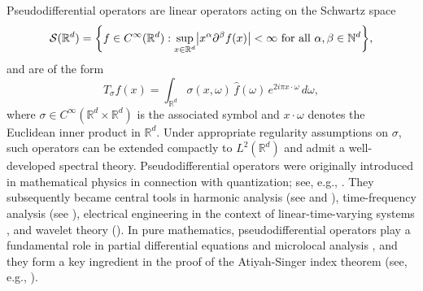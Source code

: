 \documentclass[a4paper,12pt]{article}
\let\originalleft\left
\let\originalright\right
\renewcommand{\left}{\mathopen{}\mathclose\bgroup\originalleft}
\renewcommand{\right}{\aftergroup\egroup\originalright}
\newcommand{\N}{\mathbb{N}}
\newcommand{\R}{\mathbb{R}}
\newcommand{\diff}{\mathop{}\!d}
\newcommand{\symbolnot}{\sigma}
\begin{document}
Pseudodifferential operators are linear operators acting on the Schwartz space
\[
\mathcal{S}(\R^d)
=
\left\{ f \in C^\infty(\R^d) :
\sup_{x\in\R^d} \left| x^\alpha \partial^\beta f(x) \right| < \infty
\text{ for all } \alpha, \beta \in \N^d \right\},
\]
and are of the form
\begin{equation}\label{eq:kohn-nirenberg-def}
    T_{\symbolnot} f (x)
    =
    \int_{\R^d}
    \symbolnot(x, \omega)\, \hat f (\omega)\, e^{2i\pi x \cdot \omega}\, d\omega,
\end{equation}
where $\symbolnot \in C^\infty(\R^d\times\R^d)$ is the associated symbol and
$x \cdot \omega$ denotes the Euclidean inner product in $\R^d$.
Under appropriate regularity assumptions on $\symbolnot$, such operators 
can be extended compactly to %
$L^2(\R^d)$ and admit a well-developed spectral theory. Pseudodifferential operators were originally introduced in mathematical physics in connection with quantization; see, e.g.,
\cite{weyl1950theory,wong1998weyl}.
They subsequently became central tools in harmonic analysis (see \cite{steinharmonic} and \cite[Chapter~2]{follandharmonic}), time-frequency analysis (see \cite[Chapter 14]{grochenig_foundations_2001}), 
electrical engineering in the context of linear-time-varying systems \cite{zadeh1950determination,zadeh1950frequency}, 
and wavelet theory (\cite[Chapter 2.10]{meyerWaveletsOperators1993}). 
In pure mathematics, pseudodifferential operators play a fundamental role in partial differential equations and microlocal analysis \cite{Taylor+1981,shubin_pseudodifferential_2001,hormander2007analysis,hormanderAnalysisLinearPartial2009,treves2013psido,hinzmicrolocal}, and they form a key ingredient in the proof of the Atiyah-Singer index theorem (see, e.g., \cite{landweber2005k}).
\end{document}
